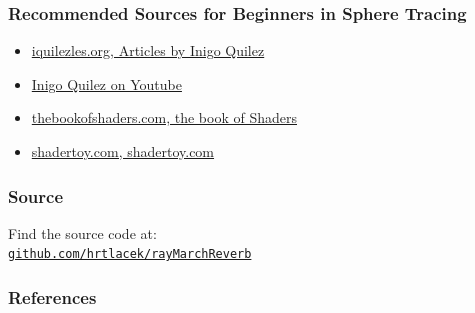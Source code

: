 \documentclass[aspectratio=169]{beamer}
\begin{document}
\begin{frame}
\frametitle{Recommended Sources for Beginners in Sphere Tracing}

\begin{itemize}
\item \href{https://www.iquilezles.org/}{iquilezles.org, Articles by Inigo Quilez}
\item \href{https://www.youtube.com/channel/UCdmAhiG8HQDlz8uyekw4ENw}{Inigo Quilez on Youtube}
\item \href{https://thebookofshaders.com/}{thebookofshaders.com, the book of Shaders}
\item \href{https://www.shadertoy.com/}{shadertoy.com, shadertoy.com}
\end{itemize}


\end{frame}

\begin{frame}
\frametitle{Source}
Find the source code at: \\
\center
\texttt{\href{https://github.com/hrtlacek/rayMarchReverb}{github.com/hrtlacek/rayMarchReverb}
}
\end{frame}


\begin{frame}[allowframebreaks]
        \frametitle{References}
        
        
\end{frame}

\end{document}
